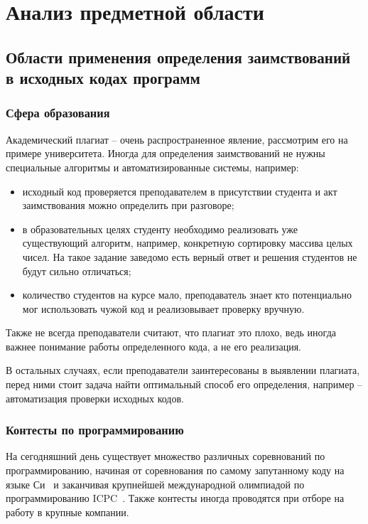 \section{Анализ предметной области}

\subsection{Области применения определения заимствований в исходных кодах программ}
\subsubsection{Сфера образования}

Академический плагиат -- очень распространенное явление, рассмотрим его на примере университета. Иногда для определения заимствований не нужны специальные алгоритмы и автоматизированные системы, например:
\begin{itemize}[label*=---]
	\item исходный код проверяется преподавателем в присутствии студента и акт заимствования можно определить при разговоре;
	\item в образовательных целях студенту необходимо реализовать уже существующий алгоритм, например, конкретную сортировку массива целых  чисел. На такое задание заведомо есть верный ответ и решения студентов не будут сильно отличаться;
	\item количество студентов на курсе мало, преподаватель знает кто потенциально мог использовать чужой код и реализовывает проверку вручную.
\end{itemize}

Также не всегда преподаватели считают, что плагиат это плохо, ведь иногда важнее понимание работы определенного кода, а не его реализация.

В остальных случаях, если преподаватели заинтересованы в выявлении плагиата, перед ними стоит задача найти оптимальный способ его определения, например --  автоматизация проверки исходных кодов.  

\subsubsection{Контесты по программированию}

На сегодняшний день существует множество различных соревнований по программированию, начиная от соревнования по самому запутанному коду на языке Си~\cite{ioccc} и заканчивая крупнейшей международной олимпиадой по программированию ICPC~\cite{icpc}. Также контесты иногда проводятся при отборе на работу в крупные компании.

